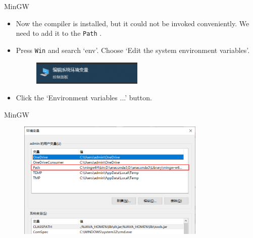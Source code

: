 \documentclass[handout]{beamer}
\begin{document}
\begin{frame}{MinGW}
    \begin{itemize}
        \item Now the compiler is installed, but it could not be invoked conveniently. We need to add it to the \texttt{Path} .
        \item Press \texttt{Win} and search `env'. Choose `Edit the system environment variables'.
        \begin{figure}[h]
            \centering
            \includegraphics[width=0.5\textwidth]{figures/start_env.png}
        \end{figure}
        \item Click the `Environment variables ...' button.
    \end{itemize}
\end{frame}

\begin{frame}{MinGW}
    \begin{figure}[h]
        \centering
        \includegraphics[width=0.8\textwidth]{figures/env_var.png}
    \end{figure}
\end{frame}
\end{document}
